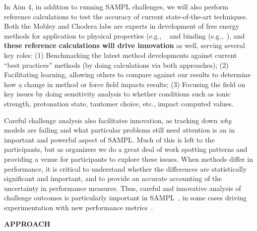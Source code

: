 \documentclass[11pt]{article}
\begin{document}
In Aim 4, in addition to running SAMPL challenges, we will also perform reference calculations to test the accuracy of current state-of-the-art techniques.
Both the Mobley and Chodera labs are experts in development of free energy methods for application to physical properties (e.g., ~\cite{mobley_blind_2014-1, Beauchamp:2015:JournalofPhysicalChemistryB, bannan_calculating_2016} and binding (e.g.,~\cite{rocklin_blind_2013, lim_sensitivity_2016, wang_identifying_2013}), and \textbf{these reference calculations will drive innovation} as well, serving several key roles: (1) Benchmarking the latest method developments against current ``best practices'' methods (by doing calculations via both approaches); (2) Facilitating learning, allowing others to compare against our results to determine how a change in method or force field impacts results; (3) Focusing the field on key issues by doing sensitivity analysis to whether conditions such as ionic strength, protonation state, tautomer choice, etc., impact computed values.

Careful challenge analysis also facilitates innovation, as tracking down \emph{why} models are failing and what particular problems still need attention is an in important and powerful aspect of SAMPL.
Much of this is left to the participants, but as organizers we do a great deal of work spotting patterns and providing a venue for participants to explore these issues.
When methods differ in performance, it is critical to understand whether the differences are statistically significant and important, and to provide an accurate accounting of the uncertainty in performance measures. 
Thus, careful and innovative analysis of challenge outcomes is particularly important in SAMPL~\cite{mobley_blind_2014-1, bannan_blind_2016, yin_overview_2016}, in some cases driving experimentation with new performance metrics~\cite{mobley_blind_2014-1}.

{\large\textbf{ APPROACH}}
\end{document}

